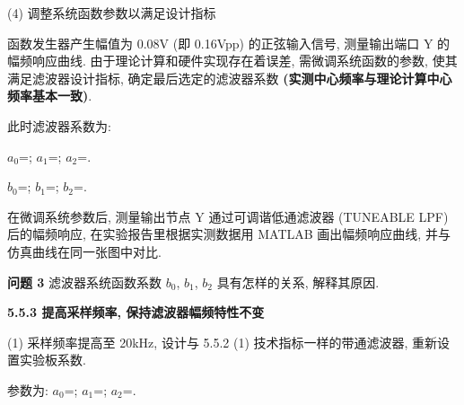 \documentclass{dspreport}
\begin{document}
\noindent(4) 调整系统函数参数以满足设计指标

函数发生器产生幅值为 0.08V (即 0.16Vpp) 的正弦输入信号, 测量输出端口 Y 的幅频响应曲线. 由于理论计算和硬件实现存在着误差, 需微调系统函数的参数, 使其满足滤波器设计指标, 确定最后选定的滤波器系数 \textbf{(实测中心频率与理论计算中心频率基本一致)}.

\begin{block}

\end{block}

\begin{figure}[H]

\end{figure}

\begin{block}

\end{block}

此时滤波器系数为:

$a_0$=\underline{\blank{  }}; $a_1$=\underline{\blank{  }}; $a_2$=\underline{\blank{  }}.

$b_0$=\underline{\blank{  }}; $b_1$=\underline{\blank{  }}; $b_2$=\underline{\blank{  }}.

在微调系统参数后, 测量输出节点 Y 通过可调谐低通滤波器 (TUNEABLE LPF) 后的幅频响应, 在实验报告里根据实测数据用 MATLAB 画出幅频响应曲线, 并与仿真曲线在同一张图中对比.

\begin{block}

\end{block}

\begin{figure}[H]

\end{figure}

\begin{block}

\end{block}

\noindent\textbf{问题 3} 滤波器系统函数系数 $b_0$, $b_1$, $b_2$ 具有怎样的关系, 解释其原因.

\begin{block}

\end{block}

\noindent\textbf{5.5.3 提高采样频率, 保持滤波器幅频特性不变}

\noindent(1) 采样频率提高至 20kHz, 设计与 5.5.2 (1) 技术指标一样的带通滤波器, 重新设置实验板系数.

参数为: $a_0$=\underline{\blank{  }}; $a_1$=\underline{\blank{  }}; $a_2$=\underline{\blank{  }}.
\end{document}

